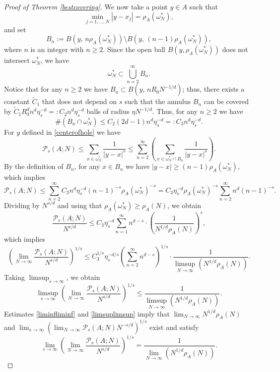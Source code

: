 \documentclass[12pt]{amsart}
\theoremstyle{definition}
\def\sli{\sum\limits}
\newcommand{\1}{\mathbf{1}}
\newcommand{\PP}{\mathcal{P}}
\begin{document}
\begin{proof}[Proof of Theorem \ref{bestcovering}]
We now take a point $y\in A$ such that
\begin{equation}\label{centerofhole}
\min_{j=1,\ldots, N}|y-x_j|=\rho_A(\omega^*_N),
\end{equation}
and set
$$ 
B_n:=B(y, \, n \rho_A(\omega^*_N)) \setminus B(y, \,(n-1) \rho_A(\omega^*_N)), 
$$
where $n$ is an integer with $n\geqslant 2$. Since the open ball $B(y, \rho_A(\omega^*_N))$ does not intersect $\omega^*_N$, we have
$$
\omega^*_N\subset \bigcup_{n=2}^\infty B_n.
$$
Notice that for any $n\geqslant 2$ we have $B_n\subset B(y, \, nR_0N^{-1/d})$; thus, there exists a constant $\tilde{C}_1$ that does not depend on $s$ such that the annulus $B_n$ can be covered by $\tilde C_1 R_0^d  n^d\eta_s^{-d}=:C_2 n^d \eta_s^{-d}$ balls of radius $\eta N^{-1/d}$. Thus, for any $n\geqslant 2$ we have
$$
\#(B_n\cap \omega^*_N)\leqslant  C_2 (2d-1)  n^d \eta_s^{-d} =:C_3  n^d  \eta_s^{-d}.
$$
For $y$ defined in \eqref{centerofhole} we have
$$
\PP_s(A; N)\leqslant \sli_{x\in \omega^*_N}\frac{1}{|y-x|^s}\leqslant \sli_{n=2}^\infty \left(\sli_{x\in \omega^*_N \cap B_n}\frac{1}{|y-x|^s}\right).
$$
By the definition of $B_n$, for any $x\in B_n$ we have $|y-x|\geqslant (n-1)\rho_A(\omega^*_N)$, which implies
\begin{equation}\label{aibolit}
\PP_s(A; N)\leqslant \sli_{n=2}^\infty C_3 n^d \eta_s^{-d} (n-1)^{-s}\rho_A(\omega^*_N)^{-s} = C_3 \eta_s^{-d}\rho_A(\omega^*_N)^{-s} \sli_{n=2}^\infty n^{d} (n-1)^{-s}.
\end{equation}
Dividing by $N^{s/d}$ and using that $\rho_A(\omega^*_N)\geqslant \rho_A(N)$, we obtain
\begin{equation}\label{trubadur}
\frac{\PP_s(A; N)}{N^{s/d}}\leqslant C_3 \eta_s^{-d} \sli_{n=1}^\infty n^{d-s} \cdot \left(\frac{1}{N^{1/d}\rho_A(N)}\right)^{s},
\end{equation}
which implies
\begin{equation}\label{petuh}
\left(\lim_{N\to \infty}\frac{\PP_s(A; N)}{N^{s/d}}\right)^{1/s}\leqslant C_3^{1/s} \eta_s^{-d/s} \left(\sli_{n=2}^\infty n^{d-s}\right)^{1/s} \cdot \frac{1}{\limsup_{N\to\infty}(N^{1/d}\rho_A(N))}.
\end{equation}
Taking $\limsup_{s\to \infty}$, we obtain
\begin{equation}\label{limsuplimsup}
\limsup_{s\to\infty}\left(\lim_{N\to \infty}\frac{\PP_s(A; N)}{N^{s/d}}\right)^{1/s}\leqslant \frac{1}{\limsup_{N\to\infty}(N^{1/d}\rho_A(N))}.
\end{equation}
Estimates \eqref{liminfliminf} and \eqref{limsuplimsup} imply that $\lim_{N\to \infty}N^{1/d}\rho_A(N)$ and $\lim_{s\to \infty}\left(\lim_{N\to \infty}\PP_s(A; N)N^{-s/d}\right)^{1/s}$ exist and satisfy
$$
\lim_{s\to\infty}\left(\lim_{N\to \infty}\frac{\PP_s(A; N)}{N^{s/d}}\right)^{1/s}= \frac{1}{\lim_{N\to\infty}(N^{1/d}\rho_A(N))}.
$$
\end{proof}
\end{document}

